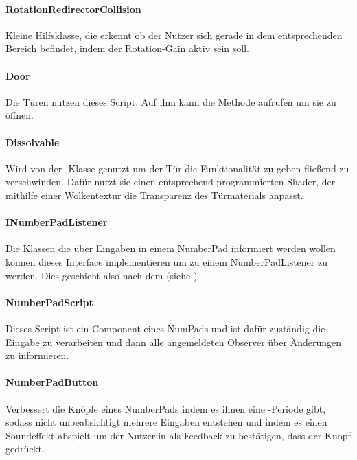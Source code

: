 \begin{multicols*}{2}
    \paragraph{RotationRedirectorCollision}
    Kleine Hilfsklasse, die erkennt ob der Nutzer sich gerade in dem entsprechenden Bereich befindet, indem der Rotation-Gain aktiv sein soll.

    \paragraph{Door}
    Die Türen nutzen dieses Script. Auf ihm kann die Methode  aufrufen um sie zu öffnen.

    \paragraph{Dissolvable}
    Wird von der -Klasse genutzt um der Tür die Funktionalität zu geben fließend zu verschwinden. Dafür nutzt sie einen entsprechend programmierten Shader, der mithilfe einer Wolkentextur die Transparenz des Türmaterials anpasst.

    \paragraph{INumberPadListener}
    Die Klassen die über Eingaben in einem NumberPad informiert werden wollen können dieses Interface implementieren um zu einem NumberPadListener zu werden. Dies geschieht also nach dem  (siehe \cite{design-patterns})

    \paragraph{NumberPadScript}
    Dieses Script ist ein Component eines NumPads und ist dafür zuständig die Eingabe zu verarbeiten und dann alle angemeldeten Observer über Änderungen zu informieren.

    \paragraph{NumberPadButton}
    Verbessert die Knöpfe eines NumberPads indem es ihnen eine -Periode gibt,
    sodass nicht unbeabsichtigt mehrere Eingaben entstehen und indem es einen Soundeffekt abspielt um der Nutzer:in als Feedback zu bestätigen, dass der Knopf gedrückt. %


\end{multicols*}
